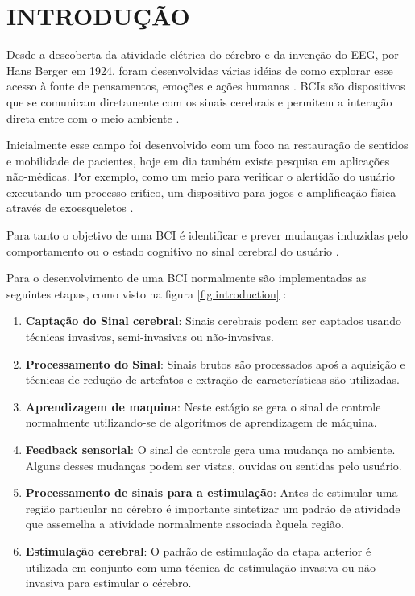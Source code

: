 \chapter{INTRODUÇÃO}

\par 
Desde a descoberta da atividade el\'etrica do c\'erebro  e da inven\c{c}\~ao do \linebreak \ac{EEG}, por Hans Berger em 1924, foram desenvolvidas v\'arias id\'eias de como explorar esse acesso \`a fonte de pensamentos, emo\c{c}\~oes e a\c{c}\~oes humanas \cite{10.3389/fnins.2016.00530}.
\ac{BCIs} s\~ao dispositivos que se comunicam diretamente com os sinais cerebrais e permitem a intera\c{c}\~ao direta entre com o meio ambiente \cite{Rao2010}.
\par 
Inicialmente esse campo foi desenvolvido com um foco na restaura\c{c}\~ao de sentidos e mobilidade de pacientes, hoje em dia tamb\'em existe pesquisa em aplica\c{c}\~oes n\~ao-m\'edicas. Por exemplo, como um meio para verificar o alertid\~ao do usu\'ario executando um processo cri\'tico, um dispositivo para jogos e amplifica\c{c}\~ao f\'isica atrav\'es de exoesqueletos \cite{RAO}\cite{10.3389/fnins.2016.00530}.
\par
Para tanto o objetivo de uma \acs{BCI} \'e identificar e prever mudan\c{c}as induzidas pelo comportamento ou o estado cognitivo no sinal cerebral do usu\'ario \cite{Rao2010}.
\par
Para o desenvolvimento de uma \acs{BCI} normalmente s\~ao implementadas as seguintes etapas, como visto na figura \ref{fig:introduction} \cite{RAO}:
\begin{enumerate}
	\item \textbf{Capta\c{c}\~ao do Sinal cerebral}: Sinais cerebrais podem ser captados usando t\'ecnicas invasivas, semi-invasivas ou n\~ao-invasivas.
	
	\item \textbf{Processamento do Sinal}: Sinais brutos s\~ao processados apo\'s a aquisi\c{c}\~ao e t\'ecnicas de redu\c{c}\~ao de artefatos e extra\c{c}\~ao de caracter\'isticas s\~ao utilizadas.
	
	\item \textbf{Aprendizagem de maquina}: Neste est\'agio se gera o sinal de controle normalmente utilizando-se de algoritmos de aprendizagem de m\'aquina. 
	
	\item \textbf{Feedback sensorial}: O sinal de controle gera uma mudan\c{c}a no ambiente.
	Alguns desses mudan\c{c}as podem ser vistas, ouvidas ou sentidas pelo usu\'ario.
	
	\item \textbf{Processamento de sinais para a estimula\c{c}\~ao}: Antes de estimular uma regi\~ao particular no c\'erebro \'e importante sintetizar um padr\~ao de atividade que assemelha a atividade normalmente associada \`aquela regi\~ao. 
	\item \textbf{Estimula\c{c}\~ao cerebral}: O padr\~ao de estimula\c{c}\~ao da etapa anterior \'e utilizada em conjunto com uma t\'ecnica de estimula\c{c}\~ao invasiva ou n\~ao-invasiva para estimular o c\'erebro. 
\end{enumerate}
